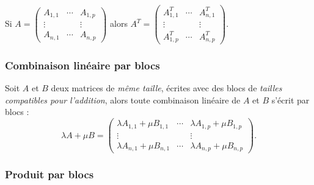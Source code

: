 \documentclass[french]{article}
\theoremstyle{plain}
\theoremstyle{definition}
\theoremstyle{remark}
\begin{document}
Si $A=\begin{pmatrix}
	A_{1,1}&\cdots&A_{1,p}\\
	\vdots&&\vdots\\
	A_{n,1}&\cdots&A_{n,p}
\end{pmatrix}$ alors $A^T=\begin{pmatrix}
A_{1,1}^T&\cdots&A_{n,1}^T\\
\vdots&&\vdots\\
A_{1,p}^T&\cdots&A_{n,p}^T
\end{pmatrix}$.

\subsubsection*{Combinaison linéaire par blocs}

Soit $A$ et $B$ deux matrices de \textit{même taille}, écrites avec des blocs de \textit{tailles compatibles pour l'addition}, alors toute combinaison linéaire de $A$ et $B$ s'écrit par blocs :
$$\lambda A+\mu B=\begin{pmatrix}
	\lambda A_{1,1}+\mu B_{1,1}&\cdots&\lambda A_{1,p}+\mu B_{1,p}\\
	\vdots&&\vdots\\
	\lambda A_{n,1}+\mu B_{n,1}&\cdots&\lambda A_{n,p}+\mu B_{n,p}
\end{pmatrix}.$$

\subsubsection*{Produit par blocs}
\end{document}
